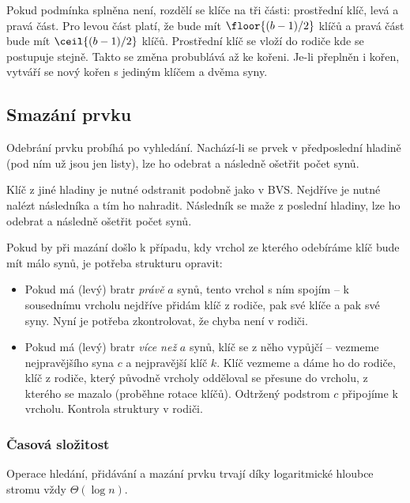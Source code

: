 Pokud podmínka splněna není, rozdělí se klíče na tři části: prostřední klíč, levá a pravá část.
Pro levou část platí, že bude mít $\floor{(b-1)/2}$ klíčů a pravá část bude mít $\ceil{(b-1)/2}$ klíčů.
Prostřední klíč se vloží do rodiče kde se postupuje stejně.
Takto se změna probublává až ke kořeni.
Je-li přeplněn i kořen, vytváří se nový kořen s jediným klíčem a dvěma syny.


\subsection{Smazání prvku}

Odebrání prvku probíhá po vyhledání.
Nachází-li se prvek v předposlední hladině (pod ním už jsou jen listy), lze ho odebrat a následně ošetřit počet synů.

Klíč z jiné hladiny je nutné odstranit podobně jako v BVS.
Nejdříve je nutné nalézt následníka a tím ho nahradit.
Následník se maže z poslední hladiny, lze ho odebrat a následně ošetřit počet synů.

Pokud by při mazání došlo k případu, kdy vrchol ze kterého odebíráme klíč bude mít málo synů, je potřeba strukturu opravit:

\begin{itemize}
    \item Pokud má (levý) bratr \textit{právě} $a$ synů, tento vrchol s ním spojím -- k sousednímu vrcholu nejdříve přidám klíč z rodiče, pak své klíče a pak své syny.
        Nyní je potřeba zkontrolovat, že chyba není v rodiči.
    
    \item Pokud má (levý) bratr \textit{více než} $a$ synů, klíč se z něho vypůjčí -- vezmeme nejpravějšího syna $c$ a nejpravější klíč $k$.
        Klíč vezmeme a dáme ho do rodiče, klíč z rodiče, který původně vrcholy odděloval se přesune do vrcholu, z kterého se mazalo (proběhne rotace klíčů).
        Odtržený podstrom $c$ připojíme k vrcholu.
        Kontrola struktury v rodiči.
\end{itemize}

\subsubsection{Časová složitost}

Operace hledání, přidávání a mazání prvku trvají díky logaritmické hloubce stromu vždy $\Theta(\log n)$.
